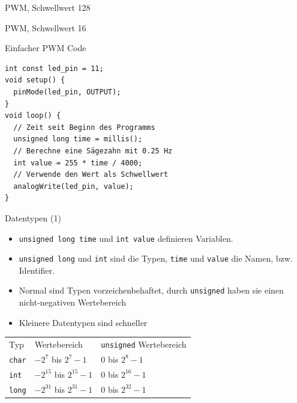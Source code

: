 \documentclass[bigger]{beamer}
\begin{document}
\begin{frame}[label={sec:org26df2f3}]{PWM, Schwellwert 128}
\end{frame}

\begin{frame}[label={sec:orgdcbb5ef}]{PWM, Schwellwert 16}
\end{frame}

\begin{frame}[fragile,label={sec:org50dfac1}]{Einfacher PWM Code}
 \begin{verbatim}
int const led_pin = 11;
void setup() {
  pinMode(led_pin, OUTPUT);
}
void loop() {
  // Zeit seit Beginn des Programms
  unsigned long time = millis();
  // Berechne eine Sägezahn mit 0.25 Hz
  int value = 255 * time / 4000;
  // Verwende den Wert als Schwellwert
  analogWrite(led_pin, value);
}
\end{verbatim}
\end{frame}

\begin{frame}[fragile,label={sec:org08c770c}]{Datentypen (1)}
 \begin{itemize}
\item \texttt{unsigned long time} und \texttt{int value} definieren Variablen.
\item \texttt{unsigned long} und \texttt{int} sind die Typen, \texttt{time} und \texttt{value} die
Namen, bzw. Identifier.
\item Normal sind Typen vorzeichenbehaftet, durch \texttt{unsigned} haben sie
einen nicht-negativen Wertebereich
\item Kleinere Datentypen sind schneller
\end{itemize}

\begin{center}
\begin{tabular}{lll}
Typ & Wertebereich & \texttt{unsigned} Wertebereich\\
\texttt{char} & \(-2^7\)  bis \(2^7-1\) & 0 bis \(2^8-1\)\\
\texttt{int} & \(-2^{15}\) bis \(2^{15}-1\) & 0 bis \(2^{16}-1\)\\
\texttt{long} & \(-2^{31}\) bis \(2^{31}-1\) & 0 bis \(2^{32}-1\)\\
\end{tabular}
\end{center}
\end{frame}
\end{document}
